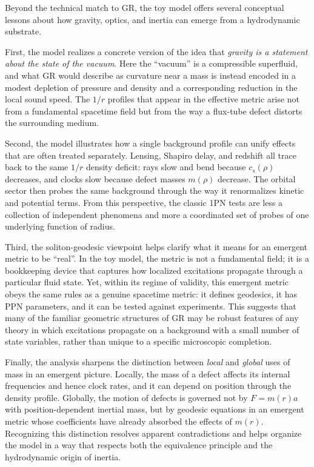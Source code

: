 \documentclass[11pt]{article}
\begin{document}
Beyond the technical match to GR, the toy model offers several conceptual
lessons about how gravity, optics, and inertia can emerge from a
hydrodynamic substrate.

First, the model realizes a concrete version of the idea that
\emph{gravity is a statement about the state of the vacuum}.
Here the ``vacuum'' is a compressible superfluid, and what GR would
describe as curvature near a mass is instead encoded in a modest depletion
of pressure and density and a corresponding reduction in the local sound
speed.
The $1/r$ profiles that appear in the effective metric arise not from a
fundamental spacetime field but from the way a flux-tube defect distorts
the surrounding medium.

Second, the model illustrates how a single background profile can unify
effects that are often treated separately.
Lensing, Shapiro delay, and redshift all trace back to the same $1/r$
density deficit: rays slow and bend because $c_s(\rho)$ decreases, and
clocks slow because defect masses $m(\rho)$ decrease.
The orbital sector then probes the same background through the way it
renormalizes kinetic and potential terms.
From this perspective, the classic 1PN tests are less a collection of
independent phenomena and more a coordinated set of probes of one
underlying function of radius.

Third, the soliton-geodesic viewpoint helps clarify what it means for an
emergent metric to be ``real''.
In the toy model, the metric is not a fundamental field; it is a
bookkeeping device that captures how localized excitations propagate
through a particular fluid state.
Yet, within its regime of validity, this emergent metric obeys the same
rules as a genuine spacetime metric: it defines geodesics, it has PPN
parameters, and it can be tested against experiments.
This suggests that many of the familiar geometric structures of GR may be
robust features of any theory in which excitations propagate on a
background with a small number of state variables, rather than unique to a
specific microscopic completion.

Finally, the analysis sharpens the distinction between \emph{local} and
\emph{global} uses of mass in an emergent picture.
Locally, the mass of a defect affects its internal frequencies and hence
clock rates, and it can depend on position through the density profile.
Globally, the motion of defects is governed not by $F = m(r) a$ with
position-dependent inertial mass, but by geodesic equations in an emergent
metric whose coefficients have already absorbed the effects of $m(r)$.
Recognizing this distinction resolves apparent contradictions and helps
organize the model in a way that respects both the equivalence principle
and the hydrodynamic origin of inertia.
\end{document}
